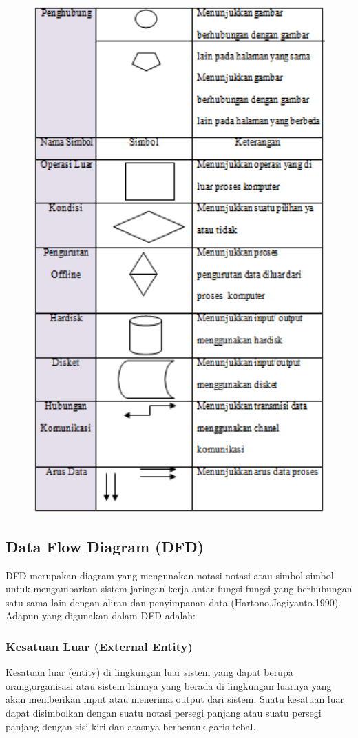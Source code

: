 \documentclass{jtetiproposalskripsi}
\begin{document}
\begin{figure}[ht!]
  \centering
    \includegraphics[width=12cm]{gambar/3}
\end{figure}
\subsection{Data Flow Diagram (DFD)}
DFD merupakan diagram yang mengunakan notasi-notasi atau simbol-simbol untuk mengambarkan sistem jaringan kerja antar fungsi-fungsi yang berhubungan satu sama lain dengan aliran dan penyimpanan data (Hartono,Jagiyanto.1990). Adapun yang digunakan dalam DFD adalah:
\subsubsection{Kesatuan Luar (External Entity)}
Kesatuan luar (entity) di lingkungan luar sistem yang dapat berupa orang,organisasi atau sistem lainnya yang berada di lingkungan luarnya yang akan memberikan input atau menerima output dari sistem. Suatu kesatuan luar dapat disimbolkan dengan suatu notasi persegi panjang atau suatu persegi panjang dengan sisi kiri dan atasnya berbentuk garis tebal.
\end{document}
